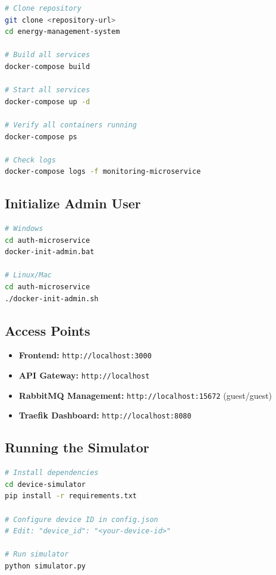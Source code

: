 \documentclass[12pt,a4paper]{article}
\begin{document}
\begin{lstlisting}[language=bash,caption=Deployment Commands]
# Clone repository
git clone <repository-url>
cd energy-management-system

# Build all services
docker-compose build

# Start all services
docker-compose up -d

# Verify all containers running
docker-compose ps

# Check logs
docker-compose logs -f monitoring-microservice
\end{lstlisting}

\subsection{Initialize Admin User}

\begin{lstlisting}[language=bash]
# Windows
cd auth-microservice
docker-init-admin.bat

# Linux/Mac
cd auth-microservice
./docker-init-admin.sh
\end{lstlisting}

\subsection{Access Points}

\begin{itemize}
    \item \textbf{Frontend:} \texttt{http://localhost:3000}
    \item \textbf{API Gateway:} \texttt{http://localhost}
    \item \textbf{RabbitMQ Management:} \texttt{http://localhost:15672} (guest/guest)
    \item \textbf{Traefik Dashboard:} \texttt{http://localhost:8080}
\end{itemize}

\subsection{Running the Simulator}

\begin{lstlisting}[language=bash]
# Install dependencies
cd device-simulator
pip install -r requirements.txt

# Configure device ID in config.json
# Edit: "device_id": "<your-device-id>"

# Run simulator
python simulator.py
\end{lstlisting}
\end{document}
